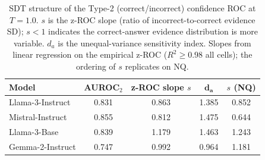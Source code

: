 \begin{table}[t]
\centering
\caption{SDT structure of the Type-2 (correct/incorrect) confidence ROC at $T{=}1.0$. $s$ is the z-ROC slope (ratio of incorrect-to-correct evidence SD); $s<1$ indicates the correct-answer evidence distribution is more variable. $d_a$ is the unequal-variance sensitivity index. Slopes from linear regression on the empirical z-ROC ($R^2\geq0.98$ all cells); the ordering of $s$ replicates on NQ.}
\label{tab:sdt}
\small
\begin{tabular}{lcccc}
\toprule
\textbf{Model} & \textbf{AUROC$_2$} & \textbf{z-ROC slope $s$} & $\boldsymbol{d_a}$ & \textbf{$s$ (NQ)} \\
\midrule
Llama-3-Instruct & 0.831 & 0.863 & 1.385 & 0.852 \\
Mistral-Instruct & 0.855 & 0.812 & 1.475 & 0.644 \\
Llama-3-Base & 0.839 & 1.179 & 1.463 & 1.243 \\
Gemma-2-Instruct & 0.747 & 0.992 & 0.964 & 1.181 \\
\bottomrule
\end{tabular}
\end{table}